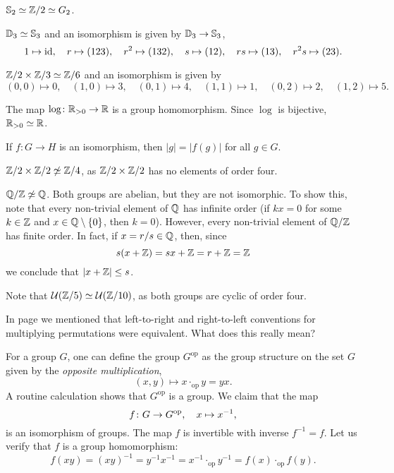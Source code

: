 \begin{example}
$\mathbb{S}_2\simeq\mathbb{Z}/2\simeq G_2$.
\end{example}

\begin{example}
$\mathbb{D}_3\simeq\mathbb{S}_3$ and an isomorphism is given by $\mathbb{D}_3\to\mathbb{S}_3$,
\[
1\mapsto \operatorname{id},\quad
r\mapsto (123),\quad r^2\mapsto(132),\quad s\mapsto(12),\quad rs\mapsto(13),\quad r^2s\mapsto(23).
\]
\end{example}

\begin{example}
$\mathbb{Z}/2\times\mathbb{Z}/3\simeq\mathbb{Z}/6$ and an isomorphism is given by 
\[
(0,0)\mapsto 0,\quad (1,0)\mapsto 3,\quad
(0,1)\mapsto 4,\quad (1,1)\mapsto 1,\quad (0,2)\mapsto 2,\quad (1,2)\mapsto 5.
\]
\end{example}

\begin{example}
The map $\log\colon\mathbb{R}_{>0}\to\mathbb{R}$ is a group homomorphism. Since
$\log$ is bijective, 
$\mathbb{R}_{>0}\simeq\mathbb{R}$.
\end{example}

If $f\colon G\to H$ is an isomorphism, then
$|g|=|f(g)|$ for all $g\in G$. 

\begin{example}
$\mathbb{Z}/2\times\mathbb{Z}/2\not\simeq\mathbb{Z}/4$, as $\mathbb{Z}/2\times\mathbb{Z}/2$ has no elements of order four. 
\end{example}

\begin{example}
$\mathbb{Q}/\mathbb{Z}\not\simeq\mathbb{Q}$. Both groups are abelian, but they are not isomorphic. To show this, note that every non-trivial element of $\mathbb{Q}$ has infinite order (if $kx=0$ for some $k\in\mathbb{Z}$ and $x\in\mathbb{Q}\setminus\{0\}$, then
$k=0$). However, every non-trivial element of $\mathbb{Q}/\mathbb{Z}$ has finite order. In fact, if $x=r/s\in\mathbb{Q}$, then, since 
\[
s(x+\mathbb{Z})=sx+\mathbb{Z}=r+\mathbb{Z}=\mathbb{Z}
\]
we conclude that $|x+\mathbb{Z}|\leq s$.
\end{example}

\begin{example}
Note that $\mathcal{U}(\mathbb{Z}/5)\simeq\mathcal{U}(\mathbb{Z}/10)$, as
both groups are cyclic of order four. 
\end{example}

In page \pageref{convention:left-to-right} we mentioned that left-to-right and right-to-left 
conventions for multiplying permutations were equivalent. What does this really mean?

\begin{example}
\label{exa:op}
    For a group $G$, 
    one can define the group $G^{\operatorname{op}}$ as the group structure 
    on the set $G$ given by the \emph{opposite multiplication},  
    \[
    (x,y)\mapsto x\cdot_{\operatorname{op}}y=yx.
    \]
    A routine calculation shows that  
    $G^{\operatorname{op}}$ is a group. We claim that the map 
    \[
    f\colon G\to G^{\operatorname{op}},\quad x\mapsto x^{-1},
    \]
    is an isomorphism of groups. The map $f$ is invertible with inverse $f^{-1}=f$. 
    Let us verify that 
    $f$ is a group homomorphism:
    \[
    f(xy)=(xy)^{-1}=y^{-1}x^{-1}=x^{-1}\cdot_{\operatorname{op}}y^{-1}=f(x)\cdot_{\operatorname{op}}f(y).
    \]
\end{example}

